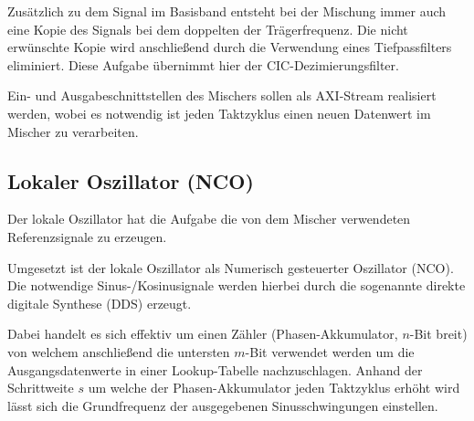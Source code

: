 Zusätzlich zu dem Signal im Basisband entsteht bei der Mischung immer auch eine Kopie des Signals bei dem doppelten der Trägerfrequenz.\cite{WPI_COSTAS}
Die nicht erwünschte Kopie wird anschließend durch die Verwendung eines Tiefpassfilters eliminiert. Diese Aufgabe übernimmt hier der \acs{CIC}-Dezimierungsfilter.

Ein- und Ausgabeschnittstellen des Mischers sollen als \acs{AXI}-Stream realisiert werden, wobei es notwendig ist jeden Taktzyklus einen neuen Datenwert
im Mischer zu verarbeiten. 

\subsection{Lokaler Oszillator (\acs{NCO})}
Der lokale Oszillator hat die Aufgabe die von dem Mischer verwendeten Referenzsignale zu erzeugen. 

Umgesetzt ist der lokale Oszillator als Numerisch gesteuerter Oszillator (\acs{NCO}). 
Die notwendige Sinus-/Kosinusignale werden hierbei durch die sogenannte direkte digitale Synthese (\acs{DDS}) erzeugt.

Dabei handelt es sich effektiv um einen Zähler (Phasen-Akkumulator, $n$-Bit breit) von welchem anschließend die untersten $m$-Bit verwendet werden
um die Ausgangsdatenwerte in einer Lookup-Tabelle nachzuschlagen.
Anhand der Schrittweite $s$ um welche der Phasen-Akkumulator jeden Taktzyklus erhöht wird lässt sich die Grundfrequenz der ausgegebenen Sinusschwingungen einstellen.

